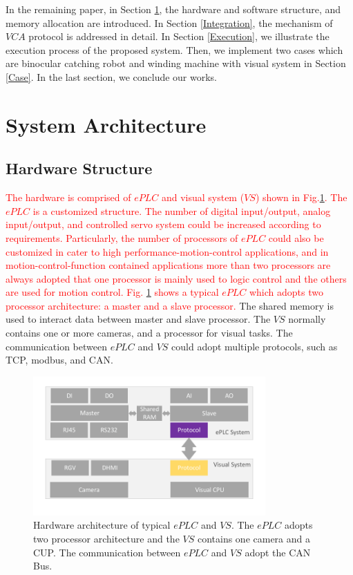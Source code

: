 \documentclass[journal,UTF8]{IEEEtran}
\begin{document}
In the remaining paper, in Section \ref{SystemStructure}, the hardware and software structure, and memory allocation are introduced. In Section \ref{Integration}, the mechanism of $VCA$ protocol is addressed in detail. In Section \ref{Execution}, we illustrate the execution process of the proposed system. Then, we implement two cases which are binocular catching robot and winding machine with visual system in Section \ref{Case}. In the last section, we conclude our works.

\section{System Architecture}
\label{SystemStructure}
\subsection{Hardware Structure}
\textcolor{red}{The hardware is comprised of $ePLC$ and visual system ($VS$) shown in Fig.\ref{fig:Hardware}. The $ePLC$ is a customized structure. The number of digital input/output, analog input/output, and controlled servo system could be increased according to requirements. Particularly, the number of processors of $ePLC$ could also be customized in cater to high performance-motion-control applications, and in motion-control-function contained applications more than two processors are always adopted that one processor is mainly used to logic control and the others are used for motion control. Fig. \ref{fig:Hardware} shows a typical $ePLC$ which adopts two processor architecture: a master and a slave processor.} The shared memory is used to interact data between master and slave processor. The $VS$ normally contains one or more cameras, and a processor for visual tasks. The communication between $ePLC$ and $VS$ could adopt multiple protocols, such as TCP, modbus, and CAN.

\begin{figure}
	\centering
	\includegraphics[width=3.5in]{fig/Hardware.pdf}
	\caption{Hardware architecture of typical $ePLC$ and $VS$. The $ePLC$ adopts two processor architecture and the $VS$ contains one camera and a CUP. The communication between $ePLC$ and $VS$ adopt the CAN Bus.}
	\label{fig:Hardware}
\end{figure}
\end{document}
